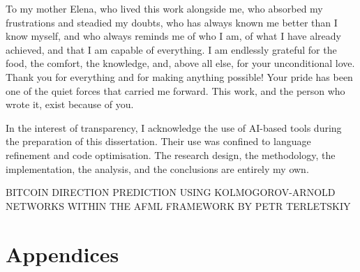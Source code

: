 \documentclass[11pt,a4paper,oneside]{article}
\begin{document}
To my mother Elena, who lived this work alongside me, who absorbed my frustrations and steadied my doubts, who has always known me better than I know myself, and who always reminds me of who I am, of what I have already achieved, and that I am capable of everything. I am endlessly grateful for the food, the comfort, the knowledge, and, above all else, for your unconditional love. Thank you for everything and for making anything possible! Your pride has been one of the quiet forces that carried me forward. This work, and the person who wrote it, exist because of you.

\vspace{0.2cm}

In the interest of transparency, I acknowledge the use of AI-based tools during the preparation of this dissertation. Their use was confined to language refinement and code optimisation. The research design, the methodology, the implementation, the analysis, and the conclusions are entirely my own.


\newpage
\thispagestyle{plain}

\setcounter{page}{1}

\begin{center}
\textsc{BITCOIN DIRECTION PREDICTION USING KOLMOGOROV-ARNOLD NETWORKS WITHIN THE AFML FRAMEWORK BY PETR TERLETSKIY}\\
\end{center}









\newpage
{}
\thispagestyle{plain}




\newpage
{}
\thispagestyle{plain}

\appendix
\section{Appendices}\label{sec:appendices}
\end{document}

